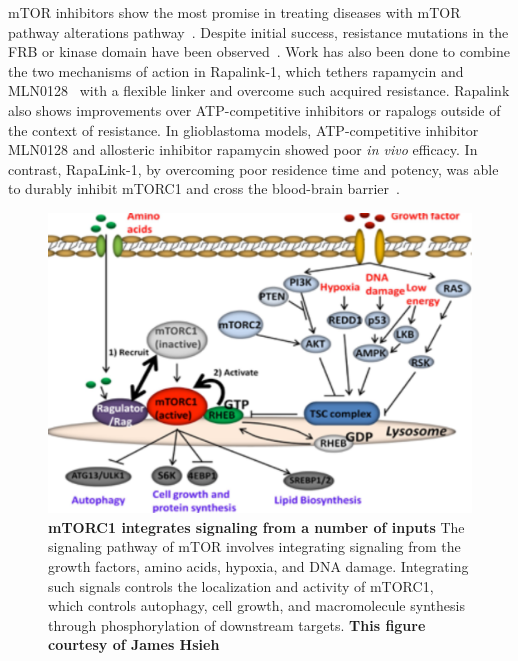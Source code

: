 \documentclass[phd,tocprelim]{cornell}
\begin{document}
mTOR inhibitors show the most promise in treating diseases with mTOR pathway alterations pathway~\citep{Wagle:2014ej}. Despite initial success, resistance mutations in the FRB or kinase domain have been observed~\citep{Wagle:2014be}. Work has also been done to combine the two mechanisms of action in Rapalink-1, which tethers rapamycin and MLN0128~\citep{RodrikOutmezguine:2016km} with a flexible linker and overcome such acquired resistance. Rapalink also shows improvements over ATP-competitive inhibitors or rapalogs outside of the context of resistance.  In glioblastoma models, ATP-competitive inhibitor MLN0128 and allosteric inhibitor rapamycin showed poor \emph{in vivo} efficacy. In contrast, RapaLink-1, by overcoming poor residence time and potency, was able to durably inhibit mTORC1 and cross the blood-brain barrier~\citep{Fan:2017fk}. 

\begin{landscape}
	\begin{figure}[p]
		\centering
		\includegraphics[width=0.8\linewidth]{figures/mtor-fig2.pdf}
		\caption[mTORC1 integrates signaling from a number of inputs]{
			{\bf mTORC1 integrates signaling from a number of inputs}
			The signaling pathway of mTOR involves integrating signaling from the growth factors, amino acids, hypoxia, and DNA damage. Integrating such signals controls the localization and activity of mTORC1, which controls autophagy, cell growth, and macromolecule synthesis through phosphorylation of downstream targets. \bf{This figure courtesy of James Hsieh} 
		}
		\label{fig:mtor-figure2}
	\end{figure}
\end{landscape}
\end{document}
